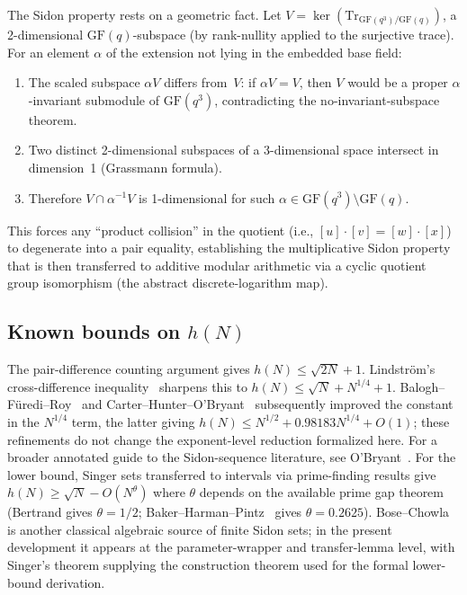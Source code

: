 \documentclass[11pt,a4paper]{article}
\begin{document}
The Sidon property rests on a geometric fact.  Let
$V = \ker(\mathrm{Tr}_{\mathrm{GF}(q^3)/\mathrm{GF}(q)})$, a 2-dimensional
$\mathrm{GF}(q)$-subspace (by rank-nullity applied to the surjective trace).
For an element \(\alpha\) of the extension not lying in the embedded base field:
\begin{enumerate}[nosep]
  \item The scaled subspace $\alpha V$ differs from~$V$: if $\alpha V = V$,
    then $V$ would be a proper $\alpha$-invariant submodule of
    $\mathrm{GF}(q^3)$, contradicting the no-invariant-subspace theorem.
  \item Two distinct 2-dimensional subspaces of a 3-dimensional space intersect
    in dimension~1 (Grassmann formula).
  \item Therefore $V \cap \alpha^{-1}V$ is 1-dimensional for such
    \(\alpha\in \mathrm{GF}(q^3)\setminus\mathrm{GF}(q)\).
\end{enumerate}
This forces any ``product collision'' in the quotient (i.e., $[u]\cdot[v] =
[w]\cdot[x]$) to degenerate into a pair equality, establishing the
multiplicative Sidon property that is then transferred to additive modular
arithmetic via a cyclic quotient group isomorphism (the abstract
discrete-logarithm map).

\subsection{Known bounds on \texorpdfstring{$h(N)$}{h(N)}}

The pair-difference counting argument gives $h(N) \le \sqrt{2N} + 1$.
Lindstr\"om's cross-difference inequality~\cite{Lindstrom1969} sharpens this to
$h(N) \le \sqrt{N} + N^{1/4} + 1$.  Balogh--F\"uredi--Roy~\cite{BaloghFurediRoy2023}
and Carter--Hunter--O'Bryant~\cite{CarterHunterOBryant2025} subsequently
improved the constant in the \(N^{1/4}\) term, the latter giving
\(h(N)\le N^{1/2}+0.98183N^{1/4}+O(1)\); these refinements do not change the
exponent-level reduction formalized here.  For a broader annotated guide to
the Sidon-sequence literature, see O'Bryant~\cite{OBryant2004}.  For the lower
bound, Singer sets transferred to intervals via prime-finding results give
$h(N) \ge \sqrt{N} - O(N^\theta)$ where $\theta$ depends on the available
prime gap theorem (Bertrand gives $\theta = 1/2$;
Baker--Harman--Pintz~\cite{BHP2001} gives $\theta = 0.2625$).
Bose--Chowla~\cite{BoseChowla1962} is another classical algebraic source of
finite Sidon sets; in the present development it appears at the
parameter-wrapper and transfer-lemma level, with Singer's theorem supplying
the construction theorem used for the formal lower-bound derivation.
\end{document}
